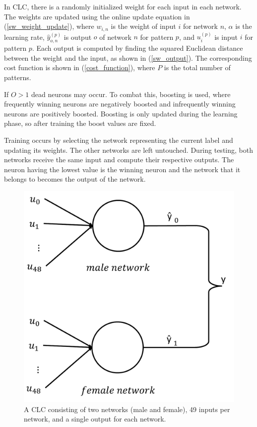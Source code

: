 \documentclass[10pt,journal]{IEEEtran}
\newcommand{\eq}[1]{(\ref{#1})}
\begin{document}
			In CLC, there is a randomly initialized weight for each input in each network. The weights are updated using the online update equation in \eq{sw_weight_update}, where \(w_{i,n}\) is the weight of input \(i\) for network \(n\), \(\alpha\) is the learning rate, \(\hat{y}_{o,n}^{(p)}\) is output \(o\) of network \(n\) for pattern \(p\), and \(u_i^{(p)}\) is input \(i\) for pattern \(p\). Each output is computed by finding the squared Euclidean distance between the weight and the input, as shown in \eq{sw_output}. The corresponding cost function is shown in \eq{cost_function}, where \(P\) is the total number of patterns.
			
			If \(O>1\) dead neurons may occur. To combat this, boosting is used, where frequently winning neurons are negatively boosted and infrequently winning neurons are positively boosted. Boosting is only updated during the learning phase, so after training the boost values are fixed.
			
			Training occurs by selecting the network representing the current label and updating its weights. The other networks are left untouched. During testing, both networks receive the same input and compute their respective outputs. The neuron having the lowest value is the winning neuron and the network that it belongs to becomes the output of the network.
			
			\begin{figure}
				\centering
				\includegraphics[width=0.8\linewidth]{network}
				\caption{A CLC consisting of two networks (male and female), 49 inputs per network, and a single output for each network.}
				\label{fig:network}
			\end{figure}
			
\end{document}

